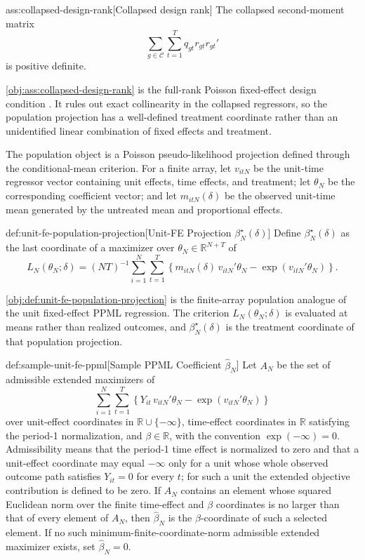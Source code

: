 \begin{assumptionv}{ass:collapsed-design-rank}[Collapsed design rank]
The collapsed second-moment matrix
\[
\sum_{g\in\mathcal C}\sum_{t=1}^T q_{gt} r_{gt} r_{gt}'
\]
is positive definite.
\end{assumptionv}

\cref{obj:ass:collapsed-design-rank} is the full-rank Poisson fixed-effect design condition \citep{White1982MisspecifiedML}. It rules out exact collinearity in the collapsed regressors, so the population projection has a well-defined treatment coordinate rather than an unidentified linear combination of fixed effects and treatment.

The population object is a Poisson pseudo-likelihood projection defined through the conditional-mean criterion. For a finite array, let \(v_{itN}\) be the unit-time regressor vector containing unit effects, time effects, and treatment; let \(\theta_N\) be the corresponding coefficient vector; and let \(m_{itN}(\delta)\) be the observed unit-time mean generated by the untreated mean and proportional effects.

\begin{definitionv}{def:unit-fe-population-projection}[Unit-FE Projection \(\beta_N^\star(\delta)\)]
Define \(\beta_N^\star(\delta)\) as the last coordinate of a maximizer over \(\theta_N\in\mathbb R^{N+T}\) of
\[
L_N(\theta_N;\delta)
=
(NT)^{-1}\sum_{i=1}^N\sum_{t=1}^T
\left\{
m_{itN}(\delta)\,v_{itN}'\theta_N-\exp(v_{itN}'\theta_N)
\right\}.
\]
\end{definitionv}

\cref{obj:def:unit-fe-population-projection} is the finite-array population analogue of the unit fixed-effect PPML regression. The criterion \(L_N(\theta_N;\delta)\) is evaluated at means rather than realized outcomes, and \(\beta_N^\star(\delta)\) is the treatment coordinate of that population projection.

\begin{definitionv}{def:sample-unit-fe-ppml}[Sample PPML Coefficient \(\hat\beta_N\)]
Let \(A_N\) be the set of admissible extended maximizers of
\[
\sum_{i=1}^N\sum_{t=1}^T
\left\{
Y_{it}\,v_{itN}'\theta_N-\exp(v_{itN}'\theta_N)
\right\}
\]
over unit-effect coordinates in \(\mathbb R\cup\{-\infty\}\), time-effect coordinates in \(\mathbb R\) satisfying the period-1 normalization, and \(\beta\in\mathbb R\), with the convention \(\exp(-\infty)=0\). Admissibility means that the period-1 time effect is normalized to zero and that a unit-effect coordinate may equal \(-\infty\) only for a unit whose whole observed outcome path satisfies \(Y_{it}=0\) for every \(t\); for such a unit the extended objective contribution is defined to be zero. If \(A_N\) contains an element whose squared Euclidean norm over the finite time-effect and \(\beta\) coordinates is no larger than that of every element of \(A_N\), then \(\hat\beta_N\) is the \(\beta\)-coordinate of such a selected element. If no such minimum-finite-coordinate-norm admissible extended maximizer exists, set \(\hat\beta_N=0\).
\end{definitionv}

